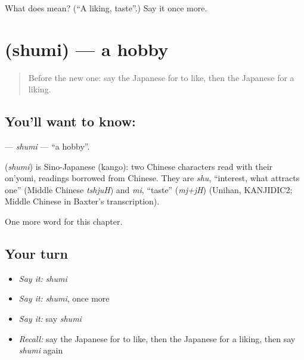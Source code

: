 \begin{tcolorbox}[breakable,colback=teal!4,colframe=teal!35!black,title={Before you move on}]
What does  mean? (\textquotedblleft{}A liking, taste\textquotedblright{}.) Say it once more.
\end{tcolorbox}
\section[\texorpdfstring{\ja{しゅみ} (shumi)}{しゅみ (shumi)}]{ (shumi) — a hobby}

\label{lesson:JA-C94-shumi}



\begin{quote}
Before the new one: say the Japanese for to like, then the Japanese for a liking.
\end{quote}

\subsection*{You'll want to know: }
\textbf{} — \emph{shumi} — \textquotedblleft{}a hobby\textquotedblright{}.

\begin{cousinweb}
\textbf{} (\emph{shumi}) is Sino-Japanese (kango): two Chinese characters read with their on'yomi, readings borrowed from Chinese. They are \emph{shu}, \textquotedblleft{}interest, what attracts one\textquotedblright{} (Middle Chinese \emph{tshjuH}) and \emph{mi}, \textquotedblleft{}taste\textquotedblright{} (\emph{mj+jH}) (Unihan, KANJIDIC2; Middle Chinese in Baxter's transcription).
\end{cousinweb}

\begin{grammarlens}[title={What you've built}]
One more word for this chapter.
\end{grammarlens}

\subsection*{Your turn}
\begin{itemize}
\raggedright
  \item \emph{Say it:} \emph{shumi}
  \item \emph{Say it:} \emph{shumi}, once more
  \item \emph{Say it:} say \emph{shumi}
  \item \emph{Recall:} say the Japanese for to like, then the Japanese for a liking, then say \emph{shumi} again
\end{itemize}

